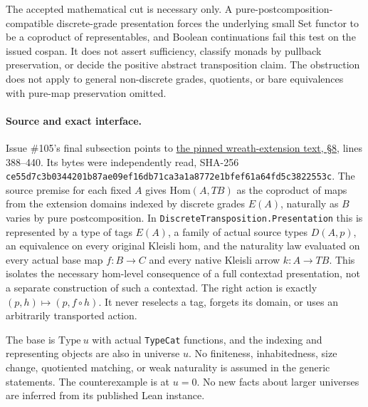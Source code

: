 \documentclass[11pt]{article}
\newcommand{\code}[1]{\texttt{#1}}
\begin{document}
The accepted mathematical cut is necessary only. A pure-postcomposition-compatible discrete-grade presentation forces the underlying small Set functor to be a coproduct of representables, and Boolean continuations fail this test on the issued cospan. It does not assert sufficiency, classify monads by pullback preservation, or decide the positive abstract transposition claim. The obstruction does not apply to general non-discrete grades, quotients, or bare equivalences with pure-map preservation omitted.

\paragraph{Source and exact interface.}
Issue \#105's final subsection points to \href{https://github.com/eternal-november/eos-research-programmes/blob/458ff36a4798e432dee5947afc402f9903a47f14/projects/contextual-composition/research-directions/wreath-extension-candidates.md\#L388}{the pinned wreath-extension text, \S 8}, lines 388--440. Its bytes were independently read, SHA-256 \nolinkurl{ce55d7c3b0344201b87ae09ef16db71ca3a1a8772e1bfef61a64fd5c3822553c}. The source premise for each fixed \(A\) gives \(\mathrm{Hom}(A,T B)\) as the coproduct of maps from the extension domains indexed by discrete grades \(E(A)\), naturally as \(B\) varies by pure postcomposition. In \code{DiscreteTransposition.Presentation} this is represented by a type of tags \(E(A)\), a family of actual source types \(D(A,p)\), an equivalence on every original Kleisli hom, and the naturality law evaluated on every actual base map \(f:B\to C\) and every native Kleisli arrow \(k:A\to T B\). This isolates the necessary hom-level consequence of a full contextad presentation, not a separate construction of such a contextad. The right action is exactly \((p,h)\mapsto(p,f\circ h)\). It never reselects a tag, forgets its domain, or uses an arbitrarily transported action.

The base is \(\mathrm{Type}\ u\) with actual \code{TypeCat} functions, and the indexing and representing objects are also in universe \(u\). No finiteness, inhabitedness, size change, quotiented matching, or weak naturality is assumed in the generic statements. The counterexample is at \(u=0\). No new facts about larger universes are inferred from its published Lean instance.
\end{document}
